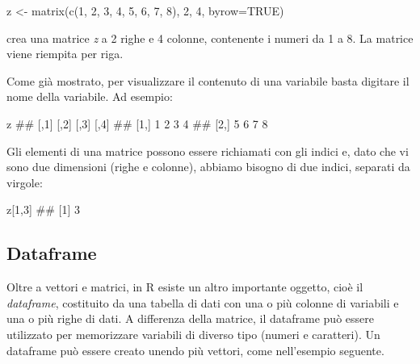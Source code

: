 \documentclass[a4paper,12pt,oneside]{book}
\newenvironment{Shaded}{\begin{snugshade}}{\end{snugshade}}
\newcommand{\DecValTok}[1]{#1}
\newcommand{\ConstantTok}[1]{#1}
\newcommand{\DocumentationTok}[1]{#1}
\newcommand{\OtherTok}[1]{#1}
\newcommand{\FunctionTok}[1]{#1}
\newcommand{\AttributeTok}[1]{#1}
\newcommand{\NormalTok}[1]{#1}
\begin{document}
\begin{Shaded}
\begin{Highlighting}[]
\NormalTok{z  }\OtherTok{\textless{}{-}}  \FunctionTok{matrix}\NormalTok{(}\FunctionTok{c}\NormalTok{(}\DecValTok{1}\NormalTok{, }\DecValTok{2}\NormalTok{, }\DecValTok{3}\NormalTok{, }\DecValTok{4}\NormalTok{, }\DecValTok{5}\NormalTok{, }\DecValTok{6}\NormalTok{, }\DecValTok{7}\NormalTok{, }\DecValTok{8}\NormalTok{), }\DecValTok{2}\NormalTok{, }\DecValTok{4}\NormalTok{, }
              \AttributeTok{byrow=}\ConstantTok{TRUE}\NormalTok{)}
\end{Highlighting}
\end{Shaded}

crea una matrice \emph{z} a 2 righe e 4 colonne, contenente i numeri da 1 a 8. La matrice viene riempita per riga.

Come già mostrato, per visualizzare il contenuto di una variabile basta digitare il nome della variabile. Ad esempio:

\begin{Shaded}
\begin{Highlighting}[]
\NormalTok{z}
\DocumentationTok{\#\#      [,1] [,2] [,3] [,4]}
\DocumentationTok{\#\# [1,]    1    2    3    4}
\DocumentationTok{\#\# [2,]    5    6    7    8}
\end{Highlighting}
\end{Shaded}

Gli elementi di una matrice possono essere richiamati con gli indici e, dato che vi sono due dimensioni (righe e colonne), abbiamo bisogno di due indici, separati da virgole:

\begin{Shaded}
\begin{Highlighting}[]
\NormalTok{z[}\DecValTok{1}\NormalTok{,}\DecValTok{3}\NormalTok{]}
\DocumentationTok{\#\# [1] 3}
\end{Highlighting}
\end{Shaded}

\hypertarget{dataframe}{%
\subsection*{Dataframe}\label{dataframe}}

Oltre a vettori e matrici, in R esiste un altro importante oggetto, cioè il \emph{dataframe}, costituito da una tabella di dati con una o più colonne di variabili e una o più righe di dati. A differenza della matrice, il dataframe può essere utilizzato per memorizzare variabili di diverso tipo (numeri e caratteri). Un dataframe può essere creato unendo più vettori, come nell'esempio seguente.
\end{document}
